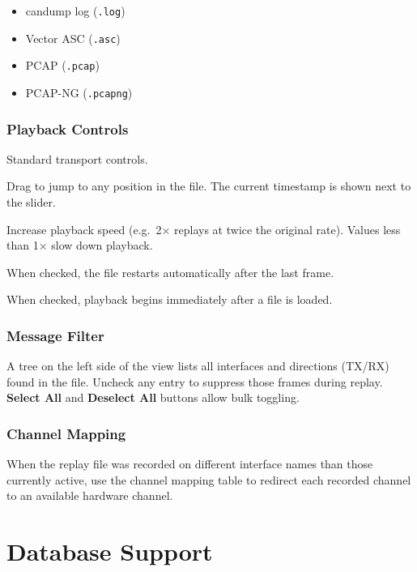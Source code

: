 \documentclass[a4paper,11pt]{article}
\newcommand{\ui}[1]{\textbf{#1}}
\newcommand{\file}[1]{\texttt{#1}}
\begin{document}
\begin{itemize}
  \item candump log (\file{.log})
  \item Vector ASC (\file{.asc})
  \item PCAP (\file{.pcap})
  \item PCAP-NG (\file{.pcapng})
\end{itemize}

\subsubsection{Playback Controls}

\begin{description}[leftmargin=2em, style=nextline]
  \item[Play / Pause / Stop] Standard transport controls.
  \item[Seek slider] Drag to jump to any position in the file. The current
        timestamp is shown next to the slider.
  \item[Speed multiplier] Increase playback speed (e.g.\ 2× replays at twice
        the original rate). Values less than 1× slow down playback.
  \item[Loop] When checked, the file restarts automatically after the last frame.
  \item[Auto-play] When checked, playback begins immediately after a file is loaded.
\end{description}

\subsubsection{Message Filter}

A tree on the left side of the view lists all interfaces and directions (TX/RX)
found in the file. Uncheck any entry to suppress those frames during replay.
\ui{Select All} and \ui{Deselect All} buttons allow bulk toggling.

\subsubsection{Channel Mapping}

When the replay file was recorded on different interface names than those currently
active, use the channel mapping table to redirect each recorded channel to an
available hardware channel.

\section{Database Support}
\end{document}
